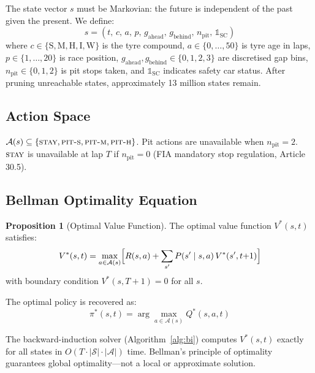 \documentclass[11pt, a4paper, twocolumn]{article}
\numberwithin{equation}{section}
\theoremstyle{definition}
\newtheorem{proposition}{Proposition}[section]
\newcommand{\states}{\mathcal{S}}
\newcommand{\actions}{\mathcal{A}}
\newcommand{\vstar}{V^*}
\newcommand{\pistar}{\pi^*}
\newcommand{\lap}{t}
\newcommand{\horizon}{T}
\newcommand{\compound}{c}
\newcommand{\age}{a}
\newcommand{\pos}{p}
\begin{document}
The state vector $s$ must be Markovian: the future is independent of the past
given the present. We define:
\begin{equation}
  s = (\lap,\, \compound,\, \age,\, \pos,\, g_{\text{ahead}},\, g_{\text{behind}},\, n_{\text{pit}},\, \mathbb{1}_{\text{SC}})
\end{equation}
where $\compound \in \{\text{S}, \text{M}, \text{H}, \text{I}, \text{W}\}$
is the tyre compound, $\age \in \{0,\ldots,50\}$ is tyre age in laps,
$\pos \in \{1,\ldots,20\}$ is race position, $g_{\text{ahead}}, g_{\text{behind}}
\in \{0,1,2,3\}$ are discretised gap bins, $n_{\text{pit}} \in \{0,1,2\}$
is pit stops taken, and $\mathbb{1}_{\text{SC}}$ indicates safety car status.
After pruning unreachable states, approximately 13 million states remain.

\subsection{Action Space}

$\actions(s) \subseteq \{\textsc{stay}, \textsc{pit-s}, \textsc{pit-m}, \textsc{pit-h}\}$.
Pit actions are unavailable when $n_{\text{pit}} = 2$.
$\textsc{stay}$ is unavailable at lap $\horizon$ if $n_{\text{pit}} = 0$
(FIA mandatory stop regulation, Article 30.5).

\subsection{Bellman Optimality Equation}

\begin{proposition}[Optimal Value Function]
The optimal value function $\vstar(s,\lap)$ satisfies:
\begin{equation}
  \vstar(s,\lap) = \max_{a \in \actions(s)} \Bigl[
    R(s,a) + \sum_{s'} P(s' \mid s, a)\,\vstar(s', \lap{+}1)
  \Bigr]
  \label{eq:bellman}
\end{equation}
with boundary condition $\vstar(s, \horizon+1) = 0$ for all $s$.
\end{proposition}

The optimal policy is recovered as:
\begin{equation}
  \pistar(s, \lap) = \arg\max_{a \in \actions(s)} Q^*(s, a, \lap)
\end{equation}

The backward-induction solver (Algorithm~\ref{alg:bi}) computes
$\vstar(s,\lap)$ exactly for all states in $O(\horizon \cdot |\states| \cdot |\actions|)$
time. Bellman's principle of optimality guarantees global optimality---not a
local or approximate solution.
\end{document}
